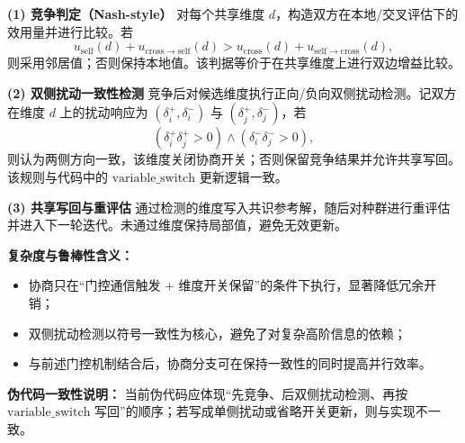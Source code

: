\documentclass[12pt]{ctexart}
\begin{document}
\textbf{(1) 竞争判定（Nash-style）}  
对每个共享维度 \(d\)，构造双方在本地/交叉评估下的效用量并进行比较。若
\[
u_{\mathrm{self}}(d)+u_{\mathrm{cross}\rightarrow\mathrm{self}}(d)
>
u_{\mathrm{cross}}(d)+u_{\mathrm{self}\rightarrow\mathrm{cross}}(d),
\]
则采用邻居值；否则保持本地值。该判据等价于在共享维度上进行双边增益比较。

\textbf{(2) 双侧扰动一致性检测}  
竞争后对候选维度执行正向/负向双侧扰动检测。记双方在维度 \(d\) 上的扰动响应为
\((\delta_i^+,\delta_i^-)\) 与 \((\delta_j^+,\delta_j^-)\)，若
\[
(\delta_i^+\delta_j^+>0)\land(\delta_i^-\delta_j^->0),
\]
则认为两侧方向一致，该维度关闭协商开关；否则保留竞争结果并允许共享写回。该规则与代码中的 \(\mathrm{variable\_switch}\) 更新逻辑一致。

\textbf{(3) 共享写回与重评估}  
通过检测的维度写入共识参考解，随后对种群进行重评估并进入下一轮迭代。未通过维度保持局部值，避免无效更新。

\textbf{复杂度与鲁棒性含义：}
\begin{itemize}
\item 协商只在“门控通信触发 + 维度开关保留”的条件下执行，显著降低冗余开销；
\item 双侧扰动检测以符号一致性为核心，避免了对复杂高阶信息的依赖；
\item 与前述门控机制结合后，协商分支可在保持一致性的同时提高并行效率。
\end{itemize}

\textbf{伪代码一致性说明：} 当前伪代码应体现“先竞争、后双侧扰动检测、再按 \(\mathrm{variable\_switch}\) 写回”的顺序；若写成单侧扰动或省略开关更新，则与实现不一致。
\end{document}
